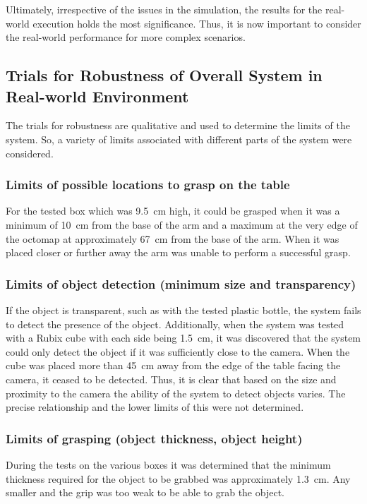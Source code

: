 \documentclass[letterpaper, 10 pt, conference]{conf/ieeeconf}  %
\begin{document}
Ultimately, irrespective of the issues in the simulation, the results for the
real-world execution holds the most significance. Thus, it is now
important to consider the real-world performance for more complex scenarios.

\subsection{Trials for Robustness of Overall System in Real-world Environment}
The trials for robustness are qualitative and used to determine the limits of
the system. So, a variety of limits associated with different parts of the
system were considered.

\subsubsection{Limits of possible locations to grasp on the table}
For the tested box which was \SI{9.5}{\centi\meter} high, it could be grasped
when it was a minimum of \SI{10}{\centi\meter} from the base of the arm and a
maximum at the very edge of the octomap at approximately \SI{67}{\centi\meter}
from the base of the arm. When it was placed closer or further away the arm was
unable to perform a successful grasp.

\subsubsection{Limits of object detection (minimum size and transparency)}
If the object is transparent, such as with the tested plastic bottle, the system
fails to detect the presence of the object. Additionally, when the system was
tested with a Rubix cube with each side being \SI{1.5}{\centi\meter}, it was
discovered that the system could only detect the object if it was sufficiently
close to the camera. When the cube was placed more than \SI{45}{\centi\meter}
away from the edge of the table facing the camera, it ceased to be detected.
Thus, it is clear that based on the size and proximity to the camera the ability
of the system to detect objects varies. The precise relationship and the lower
limits of this were not determined.

\subsubsection{Limits of grasping (object thickness, object height)}
During the tests on the various boxes it was determined that the minimum
thickness required for the object to be grabbed was approximately
\SI{1.3}{\centi\meter}. Any smaller and the grip was too weak to be able to grab
the object.
\end{document}
